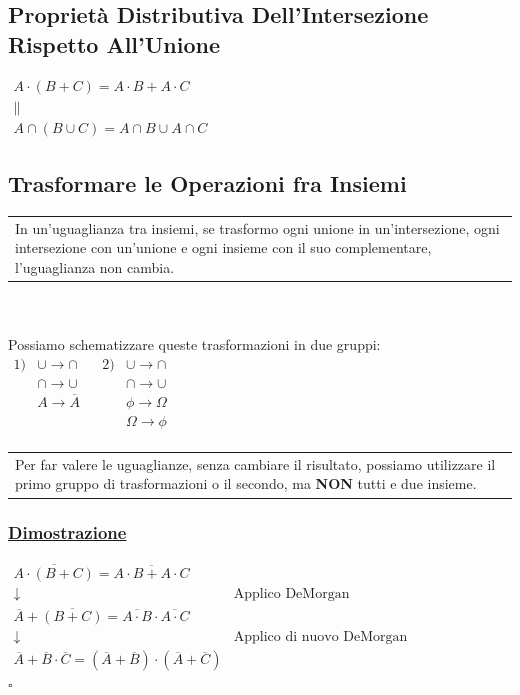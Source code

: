 \documentclass{article}
\begin{document}
\subsection{Proprietà Distributiva Dell’Intersezione Rispetto All’Unione}
$\begin{matrix}
A \cdot (B + C) = A \cdot B + A \cdot C \\
\parallel \\
A \cap (B \cup C) = A \cap B \cup A \cap C
\end{matrix}$
\subsection{Trasformare le Operazioni fra Insiemi}
\begin{tabular}{|p{13cm}}
In un’uguaglianza tra insiemi, se trasformo ogni unione in un’intersezione, ogni intersezione con un’unione e ogni insieme con il suo complementare, l’uguaglianza non cambia.
\end{tabular} \\ \\
Possiamo schematizzare queste trasformazioni in due gruppi: \\
$\begin{matrix}
1) & \cup \rightarrow \cap && 2) & \cup \rightarrow \cap \\
& \cap \rightarrow \cup && & \cap \rightarrow \cup \\
& A \rightarrow \overline{A} && & \phi \rightarrow \Omega \\
&  && & \Omega \rightarrow \phi \\
\end{matrix}$ \\
\begin{tabular}{|p{13cm}}
Per far valere le uguaglianze, senza cambiare il risultato, possiamo utilizzare il primo gruppo di trasformazioni o il secondo, ma \textbf{NON} tutti e due insieme.
\end{tabular}
\subsubsection{\underline{Dimostrazione}}
$\begin{matrix}
\overline{A \cdot (B+C)} = \overline{A \cdot B + A \cdot C} & \\
\downarrow & \text{Applico DeMorgan} \\
\overline{A} + \overline{(B+C)} = \overline{A \cdot B} \cdot \overline{A \cdot C} & \\
\downarrow & \text{Applico di nuovo DeMorgan} \\
\overline{A} + \overline{B} \cdot \overline{C} = \left(\overline{A} + \overline{B} \right) \cdot \left( \overline{A} + \overline{C} \right)
\end{matrix}$ \\
\hspace*{0pt}\hfill $\square$ 
\end{document}
